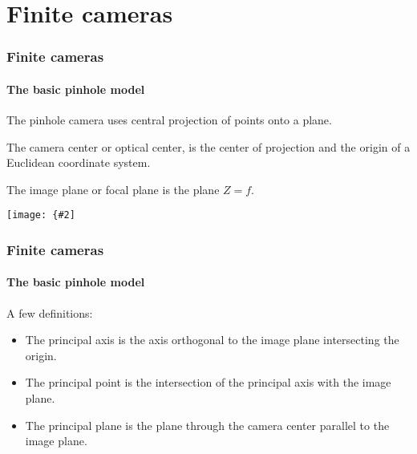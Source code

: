 \documentclass[aspectratio=169]{beamer}
\newcommand{\myfig}[3]{\centerline{\texttt{[image: \{\#2]}}}
    \centerline{\scriptsize #3}}
\begin{document}
\section{Finite cameras}

\begin{frame}
\frametitle{Finite cameras}
\framesubtitle{The basic pinhole model}

The \alert{pinhole camera} uses central projection of points onto a
plane.

\medskip

The \alert{camera center} or \alert{optical center}, is the center of
projection and the \alert{origin} of a Euclidean coordinate system.

\medskip

The \alert{image plane} or \alert{focal plane} is the plane $Z=f$.

\medskip

\myfig{4in}{HZ-fig5-1}{Hartley and Zisserman (2004), Fig.\ 6.1}

\end{frame}

\begin{frame}
\frametitle{Finite cameras}
\framesubtitle{The basic pinhole model}

A few definitions:
\begin{itemize}
\item The \alert{principal axis} is the axis orthogonal to the image
  plane intersecting the origin.
\item The \alert{principal point} is the intersection of the principal
  axis with the image plane.
\item The \alert{principal plane} is the plane through the camera
  center parallel to the image plane.
\end{itemize}

\end{frame}
\end{document}

